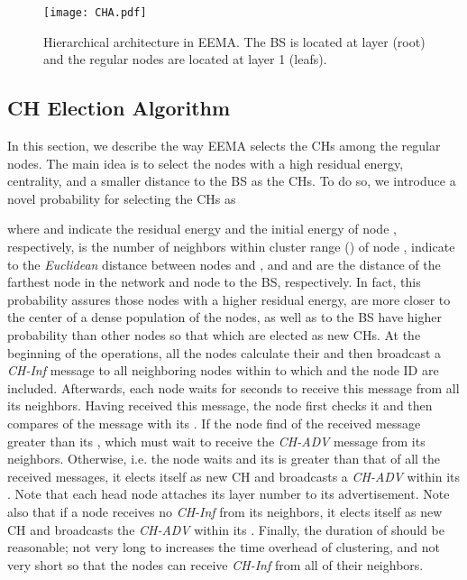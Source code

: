 \documentclass[journal]{IEEEtran}
\begin{document}
\begin{figure}[h]
\centering
\texttt{[image: CHA.pdf]}
\caption{Hierarchical architecture in EEMA. The BS is located at layer  (root) and the regular nodes are located at layer 1 (leafs).}
\label{fig:CHA}
\end{figure}
 
\subsection{CH Election Algorithm}
\label{subsec:CH-el}

 In this section, we describe the way EEMA selects the CHs among the regular nodes.  The main idea is to select the nodes with a high residual energy, centrality, and a smaller distance to the BS as the CHs.  To do so, we introduce a novel probability for selecting the CHs as 

where  and  indicate the residual energy and the initial energy of node , respectively,  is the number of neighbors within cluster range () of node ,  indicate to the \textit{Euclidean} distance between nodes  and , and  and  are the distance of the farthest node in the network and node  to the BS, respectively. In fact, this probability assures those nodes with a higher residual energy, are more closer to the center of a dense population of the nodes, as well as to the BS have higher probability than other nodes so that which are elected as new CHs. 
At the beginning of the operations, all the nodes calculate their   and then broadcast a {\it CH-Inf} message to all neighboring nodes within  to which  and the node ID are included.  Afterwards, each node waits for  seconds to receive this message from all its neighbors.  Having received this message, the node first checks it and then compares  of the message with its . If the node find  of the received message greater than its , which must wait to receive the {\it CH-ADV} message from its neighbors.  Otherwise, i.e. the node waits and its  is greater than that of all the received messages, it elects itself as new CH  and  broadcasts a {\it CH-ADV} within its . Note that each head node attaches its layer number to its advertisement. Note also that if a node receives no {\it CH-Inf} from its neighbors, it elects itself as new CH and broadcasts the {\it CH-ADV} within its . Finally, the duration of  should be reasonable; not very long to increases the time overhead of clustering, and not very short so that the nodes can receive {\it CH-Inf} from all of their neighbors.
 
\end{document}
